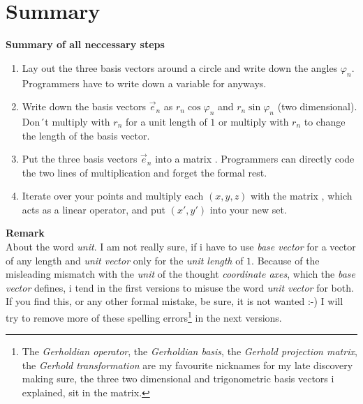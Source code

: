 \documentclass[a4paper]{article}
\begin{document}
\section{Summary}

\textbf{Summary of all neccessary steps}
\begin{enumerate}
\item Lay out the three basis vectors around a circle and write down the angles $\varphi_n$. Programmers have to write down a variable for anyways.
\item Write down the basis vectors $\vec{e}_n$ as $r_n \cos \varphi_n$ and $r_n \sin \varphi_n$ (two dimensional). Don´t multiply with $r_n$ for a unit length of $1$ or multiply with $r_n$ to change the length of the basis vector.
\item Put the three basis vectors $\vec{e}_n$ into a matrix . Programmers can directly code the two lines of multiplication and forget the formal rest.
\item Iterate over your points and multiply each $(x,y,z)$ with the matrix , which acts as a linear operator, and put $(x',y')$ into your new set.
\end{enumerate}

\textbf{Remark}\\
About the word \emph{unit}. I am not really sure, if i have to use \emph{base vector} for a vector of any length and \emph{unit vector} only for the \emph{unit length} of $1$. Because of the misleading mismatch with the \emph{unit} of the thought \emph{coordinate axes}, which the \emph{base vector} defines, i tend in the first versions to misuse the word \emph{unit vector} for both. If you find this, or any other formal mistake, be sure, it is not wanted :-) I will try to remove more of these spelling errors\footnote{The \emph{Gerholdian operator}, the \emph{Gerholdian basis}, the \emph{Gerhold projection matrix}, the \emph{Gerhold transformation} are my favourite nicknames for my late discovery making sure, the three two dimensional and trigonometric basis vectors i explained, sit in the matrix.} in the next versions.
\end{document}
